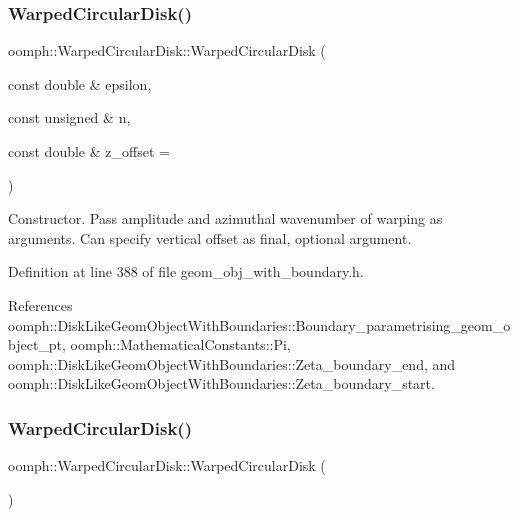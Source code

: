 \subsubsection{\texorpdfstring{Warped\+Circular\+Disk()}{WarpedCircularDisk()}\hspace{0.1cm}{\footnotesize\ttfamily [1/3]}}
{\footnotesize\ttfamily oomph\+::\+Warped\+Circular\+Disk\+::\+Warped\+Circular\+Disk (\begin{DoxyParamCaption}\item[{const double \&}]{epsilon,  }\item[{const unsigned \&}]{n,  }\item[{const double \&}]{z\+\_\+offset = {} }\end{DoxyParamCaption})\hspace{0.3cm}{\ttfamily [inline]}}

Constructor. Pass amplitude and azimuthal wavenumber of warping as arguments. Can specify vertical offset as final, optional argument. 

Definition at line 388 of file geom\+\_\+obj\+\_\+with\+\_\+boundary.\+h.



References oomph\+::\+Disk\+Like\+Geom\+Object\+With\+Boundaries\+::\+Boundary\+\_\+parametrising\+\_\+geom\+\_\+object\+\_\+pt, oomph\+::\+Mathematical\+Constants\+::\+Pi, oomph\+::\+Disk\+Like\+Geom\+Object\+With\+Boundaries\+::\+Zeta\+\_\+boundary\+\_\+end, and oomph\+::\+Disk\+Like\+Geom\+Object\+With\+Boundaries\+::\+Zeta\+\_\+boundary\+\_\+start.

\mbox{\label{classoomph_1_1WarpedCircularDisk_a6715e7330692a145513fe6c04cf57773}} 
\subsubsection{\texorpdfstring{Warped\+Circular\+Disk()}{WarpedCircularDisk()}\hspace{0.1cm}{\footnotesize\ttfamily [2/3]}}
{\footnotesize\ttfamily oomph\+::\+Warped\+Circular\+Disk\+::\+Warped\+Circular\+Disk (\begin{DoxyParamCaption}{ }\end{DoxyParamCaption})\hspace{0.3cm}{\ttfamily [inline]}}



